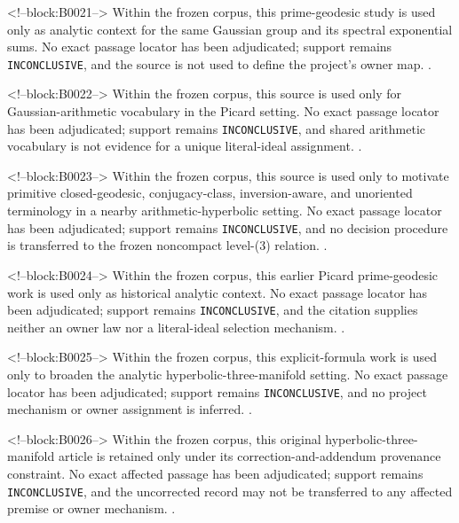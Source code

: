 \documentclass[11pt,a4paper]{article}
\begin{document}
<!--block:B0021-->
Within the frozen corpus, this prime-geodesic study is used only as analytic context for the same Gaussian group and its spectral exponential sums. No exact passage locator has been adjudicated; support remains \texttt{INCONCLUSIVE}, and the source is not used to define the project's owner map.
\citep{P29-S02}.

<!--block:B0022-->
Within the frozen corpus, this source is used only for Gaussian-arithmetic vocabulary in the Picard setting. No exact passage locator has been adjudicated; support remains \texttt{INCONCLUSIVE}, and shared arithmetic vocabulary is not evidence for a unique literal-ideal assignment.
\citep{P29-S03}.

<!--block:B0023-->
Within the frozen corpus, this source is used only to motivate primitive closed-geodesic, conjugacy-class, inversion-aware, and unoriented terminology in a nearby arithmetic-hyperbolic setting. No exact passage locator has been adjudicated; support remains \texttt{INCONCLUSIVE}, and no decision procedure is transferred to the frozen noncompact level-(3) relation.
\citep{P29-S08}.

<!--block:B0024-->
Within the frozen corpus, this earlier Picard prime-geodesic work is used only as historical analytic context. No exact passage locator has been adjudicated; support remains \texttt{INCONCLUSIVE}, and the citation supplies neither an owner law nor a literal-ideal selection mechanism.
\citep{P29-S04}.

<!--block:B0025-->
Within the frozen corpus, this explicit-formula work is used only to broaden the analytic hyperbolic-three-manifold setting. No exact passage locator has been adjudicated; support remains \texttt{INCONCLUSIVE}, and no project mechanism or owner assignment is inferred.
\citep{P29-S05}.

<!--block:B0026-->
Within the frozen corpus, this original hyperbolic-three-manifold article is retained only under its correction-and-addendum provenance constraint. No exact affected passage has been adjudicated; support remains \texttt{INCONCLUSIVE}, and the uncorrected record may not be transferred to any affected premise or owner mechanism.
\citep{P29-S06}.
\end{document}
